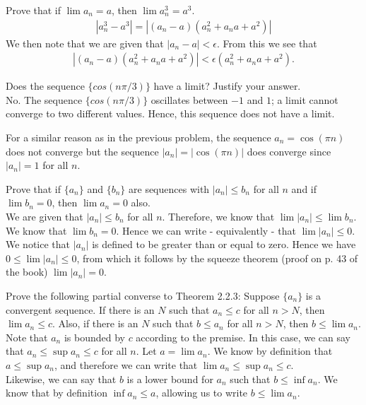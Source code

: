 \documentclass[12pt]{book}
\newenvironment{exercise}[2][Exercise]{\begin{trivlist}
\item[\hskip \labelsep {\bfseries #1}\hskip \labelsep {\bfseries #2.}]}{\end{trivlist}}
\begin{document}
\begin{exercise}{2.2.8}
Prove that if $\lim a_n = a$, then $\lim a_n^3 = a^3$. 
	\begin{align*}
	|a_n^3 - a^3 | = |(a_n - a) (a_n^2 + a_n a + a^2)|
	\end{align*}
We then note that we are given that $|a_n - a| < \epsilon$. From this we see that 
	\begin{align*}
	|(a_n - a) (a_n^2 + a_n a + a^2)| < \epsilon (a_n^2 + a_n a + a^2).
	\end{align*}
\end{exercise}


\begin{exercise}{2.2.9}
Does the sequence $\{cos(n \pi /3)\}$ have a limit? Justify your answer. \\

No. The sequence $\{cos(n \pi /3)\}$ oscillates between $-1$ and $1$; a limit cannot converge to two different values. Hence, this sequence does not have a limit.
\end{exercise}

\begin{exercise}{2.2.10}
For a similar reason as in the previous problem, the sequence $a_n = \cos (\pi n)$ does not converge but the sequence $|a_n| = |\cos (\pi n)|$ does converge since $|a_n| = 1$ for all $n$. 
\end{exercise}

\begin{exercise}{2.2.11}
Prove that if $\{a_n\}$ and $\{b_n\}$ are sequences with $|a_n| \leq b_n$ for all $n$ and if $\lim b_n =0$, then $\lim a_n = 0$ also. \\

We are given that $ |a_n|  \leq b_n$ for all $n$. Therefore, we know that $ \lim |a_n| \leq \lim b_n$. We know that $\lim b_n = 0$. Hence we can write - equivalently - that $\lim |a_n| \leq 0$. We notice that $|a_n|$ is defined to be greater than or equal to zero. Hence we have $0 \leq \lim |a_n| \leq 0$, from which it follows by the squeeze theorem (proof on p. 43 of the book) $\lim |a_n| = 0$.
\end{exercise}


\begin{exercise}{2.2.12}
Prove the following partial converse to Theorem 2.2.3: Suppose $\{a_n\}$ is a convergent sequence. If there is an $N$ such that $a_n \leq c$ for all $n > N$, then $\lim a_n \leq c$. Also, if there is an $N$ such that $b \leq a_n$ for all $n > N$, then $b \leq \lim a_n$. \\

Note that ${a_n}$ is bounded by $c$ according to the premise. In this case, we can say that $a_n \leq \sup a_n \leq c$ for all $n$. Let $ a = \lim a_n$. We know by definition that $a \leq \sup a_n$, and therefore we can write that $\lim a_n \leq \sup a_n \leq c$. \\
Likewise, we can say that $b$ is a lower bound for $a_n$ such that $b \leq \inf a_n$. We know that by definition $\inf a_n \leq a$, allowing us to write $b \leq \lim a_n$.
\end{exercise}
\end{document}
